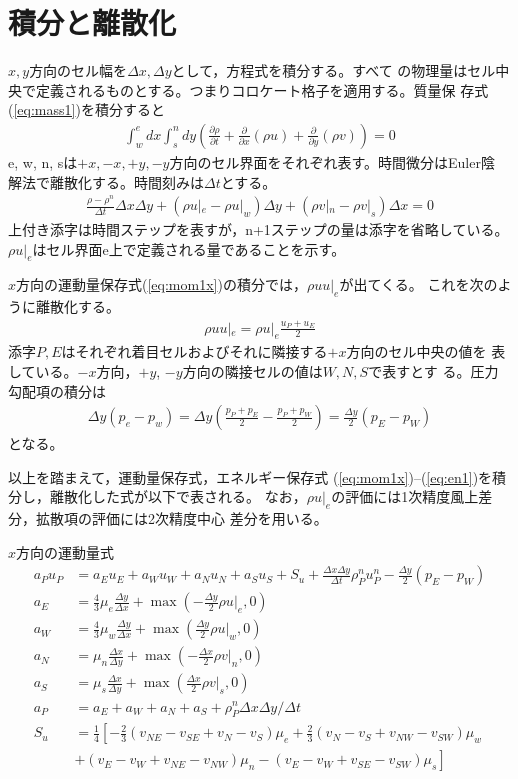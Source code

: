 \documentclass[a4paper,10pt,fleqn]{jsarticle}
\begin{document}
\section{積分と離散化}
$x,y$方向のセル幅を$\Delta x, \Delta y$として，方程式を積分する。すべて
の物理量はセル中央で定義されるものとする。つまりコロケート格子を適用する。質量保
存式(\ref{eq:mass1})を積分すると
\begin{align}
 \int_w^e dx \int_s^ndy \left(\frac{\partial \rho}{\partial t} + \frac{\partial}{\partial x}(\rho
 u) + \frac{\partial}{\partial y}(\rho  v) \right) =0
\end{align}
e, w, n, sは$+x, -x, +y, -y$方向のセル界面をそれぞれ表す。時間微分はEuler陰
解法で離散化する。時間刻みは$\Delta t$とする。
\begin{align}
 \frac{\rho - \rho^n}{\Delta t} \Delta x \Delta y 
+ \left(\rho u|_e - \rho u|_w\right)\Delta y 
+ \left(\rho v|_n - \rho v|_s\right) \Delta x = 0  
\end{align}
上付き添字は時間ステップを表すが，n+1ステップの量は添字を省略している。$\rho u|_e$はセル界面e上で定義される量であることを示す。

$x$方向の運動量保存式(\ref{eq:mom1x})の積分では，$\rho uu|_e$が出てくる。
これを次のように離散化する。
\begin{align}
 \rho uu|_e = \rho u|_e \frac{u_P +u_E}{2}
\end{align}
添字$P, E$はそれぞれ着目セルおよびそれに隣接する$+x$方向のセル中央の値を
表している。$-x$方向，$+y$, $-y$方向の隣接セルの値は$W, N, S$で表すとす
る。圧力勾配項の積分は
\begin{align}
 \Delta y(p_e - p_w) = \Delta y \left(\frac{p_P+p_E}{2} -
 \frac{p_P+p_W}{2}\right) = \frac{\Delta y}{2}(p_E-p_W)
\end{align}
となる。

以上を踏まえて，運動量保存式，エネルギー保存式
(\ref{eq:mom1x})--(\ref{eq:en1})を積分し，離散化した式が以下で表される。
なお，$\rho u|_e$の評価には1次精度風上差分，拡散項の評価には2次精度中心
差分を用いる。

$x$方向の運動量式
\begin{align}
  a_Pu_P&=a_E u_E + a_Wu_W + a_N u_N+a_S u_S +S_u +\frac{\Delta x\Delta
 y}{\Delta t}\rho_P^n u_P^n - \frac{\Delta y}{2}(p_E-p_W) \\
 a_E &= \frac{4}{3}\mu_e \frac{\Delta y}{\Delta x} + \max(-\frac{\Delta
 y}{2} \rho u|_e, 0)\\
a_W &=  \frac{4}{3}\mu_w \frac{\Delta y}{\Delta x} + \max(\frac{\Delta
 y}{2} \rho u|_w, 0)\\
 a_N &= \mu_n \frac{\Delta x}{\Delta y} + \max(-\frac{\Delta
 x}{2} \rho v|_n, 0)\\
 a_S &= \mu_s \frac{\Delta x}{\Delta y} + \max(\frac{\Delta
 x}{2} \rho v|_s, 0) \\
a_P &= a_E +a_W + a_N + a_S + \rho_P^n \Delta x \Delta y/\Delta t \\
S_u &= \frac{1}{4} \left[ -\frac{2}{3} (v_{NE}-v_{SE}+v_N-v_S) \mu_e
 + \frac{2}{3}(v_N-v_S+v_{NW}-v_{SW}) \mu_w\right. \nonumber \\
&\left. +(v_E-v_W +v_{NE} -v_{NW} )\mu_n - (v_E-v_W+v_{SE}-v_{SW})\mu_s \right]
\end{align}
\end{document}
